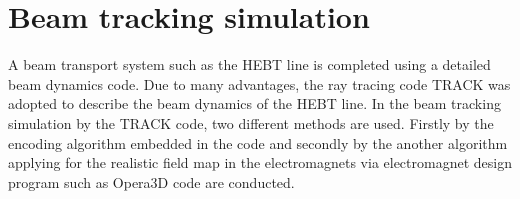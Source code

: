\documentclass[jkps,preprint,fleqn,showpacs,showkeys]{revtex4}
\begin{document}
\section{Beam tracking simulation}
\label{sec:TRACK}
A beam transport system such as the HEBT line is completed using a detailed beam dynamics code.
Due to many advantages, the ray tracing code TRACK\cite{TRACK} was adopted to describe the beam dynamics of the HEBT line.
In the beam tracking simulation by the TRACK code, two different methods are used. Firstly by the encoding algorithm embedded in the code
and secondly by the another algorithm applying for the realistic field map in the electromagnets
via electromagnet design program such as Opera3D code are conducted.
\end{document}
